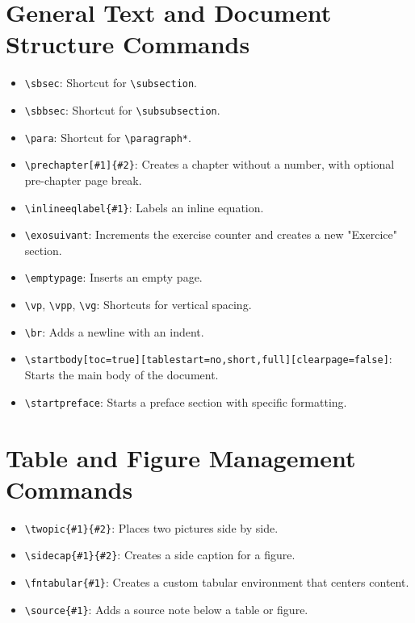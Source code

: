 \documentclass[12pt,twoside]{report}
\begin{document}
\section{General Text and Document Structure Commands}
\begin{itemize}
    \item \verb|\sbsec|: Shortcut for \verb|\subsection|.
    \item \verb|\sbbsec|: Shortcut for \verb|\subsubsection|.
    \item \verb|\para|: Shortcut for \verb|\paragraph*|.
    \item \verb|\prechapter[#1]{#2}|: Creates a chapter without a number, with optional pre-chapter page break.
    \item \verb|\inlineeqlabel{#1}|: Labels an inline equation.
    \item \verb|\exosuivant|: Increments the exercise counter and creates a new "Exercice" section.
    \item \verb|\emptypage|: Inserts an empty page.
    \item \verb|\vp|, \verb|\vpp|, \verb|\vg|: Shortcuts for vertical spacing.
    \item \verb|\br|: Adds a newline with an indent.
    \item \verb|\startbody[toc=true][tablestart=no,short,full][clearpage=false]|: Starts the main body of the document.
    \item \verb|\startpreface|: Starts a preface section with specific formatting.
\end{itemize}

\section{Table and Figure Management Commands}
\begin{itemize}
    \item \verb|\twopic{#1}{#2}|: Places two pictures side by side.
    \item \verb|\sidecap{#1}{#2}|: Creates a side caption for a figure.
    \item \verb|\fntabular{#1}|: Creates a custom tabular environment that centers content.
    \item \verb|\source{#1}|: Adds a source note below a table or figure.
\end{itemize}
\end{document}
